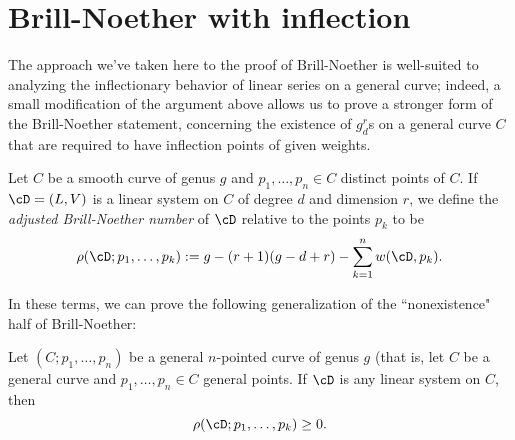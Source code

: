 \section{Brill-Noether with inflection}

The approach we've taken here to the proof of Brill-Noether is well-suited to analyzing the inflectionary behavior of linear series on a general curve; indeed, a small modification of the argument above allows us to prove a stronger form of the Brill-Noether statement, concerning the existence of $g^r_d$s on a general curve $C$ that are required to
 have inflection points of given weights.

\begin{definition}
Let $C$ be a smooth curve of genus $g$ and $p_1,\dots,p_n \in C$ distinct points of $C$. If $\cD = (L,V)$ is a linear system on $C$ of degree $d$ and dimension $r$, we define the \emph{adjusted Brill-Noether number} of $\cD$ relative to the points $p_k$ to be
$$
\rho(\cD; p_1,\dots,p_k) := g - (r+1)(g-d+r) - \sum_{k=1}^n w(\cD,p_k).
$$
\end{definition}

In these terms, we can prove the following generalization of the ``nonexistence" half of Brill-Noether:

\begin{theorem}\label{Brill-Noether with inflection}
Let $(C;p_1,\dots,p_n)$ be a general $n$-pointed curve of genus $g$ (that is, let $C$ be a general curve and $p_1,\dots,p_n \in C$ general points. If $\cD$ is any linear system on $C$, then
$$
\rho(\cD; p_1,\dots,p_k) \geq 0.
$$
\end{theorem}

